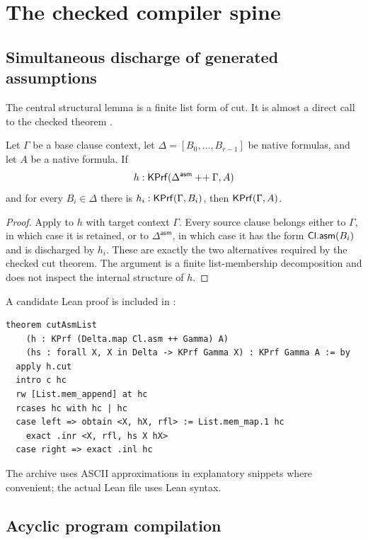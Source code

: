 \section{The checked compiler spine}

\subsection{Simultaneous discharge of generated assumptions}

The central structural lemma is a finite list form of cut.  It is almost a
direct call to the checked theorem .

\begin{theorem}\label{thm:list-cut}
Let \(\Gamma\) be a base clause context, let
\(\Delta=[B_0,\ldots,B_{r-1}]\) be native formulas, and let \(A\) be a native
formula.  If
\[
  h:\mathsf{KPrf}(\Delta^{\mathsf{asm}}\mathbin{++}\Gamma,A)
\]
and for every \(B_i\in\Delta\) there is
\(h_i:\mathsf{KPrf}(\Gamma,B_i)\), then \(\mathsf{KPrf}(\Gamma,A)\).
\end{theorem}

\begin{proof}
Apply  to \(h\) with target context \(\Gamma\).  Every source
clause belongs either to \(\Gamma\), in which case it is retained, or to
\(\Delta^{\mathsf{asm}}\), in which case it has the form
\(\mathsf{Cl}.\mathsf{asm}(B_i)\) and is discharged by \(h_i\).  These are exactly the
two alternatives required by the checked cut theorem.  The argument is a
finite list-membership decomposition and does not inspect the internal
structure of \(h\).
\end{proof}

A candidate Lean proof is included in :

\begin{lstlisting}[language={},caption={Candidate direct proof of list cut}]
theorem cutAsmList
    (h : KPrf (Delta.map Cl.asm ++ Gamma) A)
    (hs : forall X, X in Delta -> KPrf Gamma X) : KPrf Gamma A := by
  apply h.cut
  intro c hc
  rw [List.mem_append] at hc
  rcases hc with hc | hc
  case left => obtain <X, hX, rfl> := List.mem_map.1 hc
    exact .inr <X, rfl, hs X hX>
  case right => exact .inl hc
\end{lstlisting}
The archive uses ASCII approximations in explanatory snippets where convenient;
the actual Lean file uses Lean syntax.

\subsection{Acyclic program compilation}

